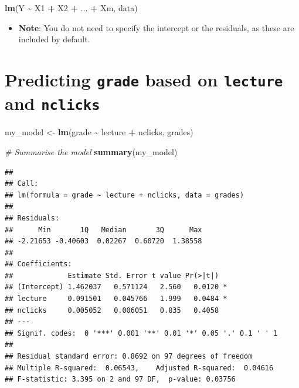 \documentclass[
]{article}
\newenvironment{Shaded}{\begin{snugshade}}{\end{snugshade}}
\newcommand{\CommentTok}[1]{\textcolor[rgb]{0.56,0.35,0.01}{\textit{#1}}}
\newcommand{\FunctionTok}[1]{\textcolor[rgb]{0.13,0.29,0.53}{\textbf{#1}}}
\newcommand{\NormalTok}[1]{#1}
\newcommand{\OtherTok}[1]{\textcolor[rgb]{0.56,0.35,0.01}{#1}}
\newcommand{\SpecialCharTok}[1]{\textcolor[rgb]{0.81,0.36,0.00}{\textbf{#1}}}
\providecommand{\tightlist}{%
  \setlength{\itemsep}{0pt}\setlength{\parskip}{0pt}}
\begin{document}
\begin{Shaded}
\begin{Highlighting}[]
\FunctionTok{lm}\NormalTok{(Y }\SpecialCharTok{\textasciitilde{}}\NormalTok{ X1 }\SpecialCharTok{+}\NormalTok{ X2 }\SpecialCharTok{+}\NormalTok{ ... }\SpecialCharTok{+}\NormalTok{ Xm, data)}
\end{Highlighting}
\end{Shaded}

\begin{itemize}
\tightlist
\item
  \textbf{Note}: You do not need to specify the intercept or the
  residuals, as these are included by default.
\end{itemize}

\hypertarget{predicting-grade-based-on-lecture-and-nclicks}{%
\section{\texorpdfstring{Predicting \texttt{grade} based on
\texttt{lecture} and
\texttt{nclicks}}{Predicting grade based on lecture and nclicks}}\label{predicting-grade-based-on-lecture-and-nclicks}}

\begin{Shaded}
\begin{Highlighting}[]
\NormalTok{my\_model }\OtherTok{\textless{}{-}} 
  \FunctionTok{lm}\NormalTok{(grade }\SpecialCharTok{\textasciitilde{}}\NormalTok{ lecture }\SpecialCharTok{+}\NormalTok{ nclicks, grades)}

\CommentTok{\# Summarise the model}
\FunctionTok{summary}\NormalTok{(my\_model)}
\end{Highlighting}
\end{Shaded}

\begin{verbatim}
## 
## Call:
## lm(formula = grade ~ lecture + nclicks, data = grades)
## 
## Residuals:
##      Min       1Q   Median       3Q      Max 
## -2.21653 -0.40603  0.02267  0.60720  1.38558 
## 
## Coefficients:
##             Estimate Std. Error t value Pr(>|t|)  
## (Intercept) 1.462037   0.571124   2.560   0.0120 *
## lecture     0.091501   0.045766   1.999   0.0484 *
## nclicks     0.005052   0.006051   0.835   0.4058  
## ---
## Signif. codes:  0 '***' 0.001 '**' 0.01 '*' 0.05 '.' 0.1 ' ' 1
## 
## Residual standard error: 0.8692 on 97 degrees of freedom
## Multiple R-squared:  0.06543,    Adjusted R-squared:  0.04616 
## F-statistic: 3.395 on 2 and 97 DF,  p-value: 0.03756
\end{verbatim}
\end{document}
